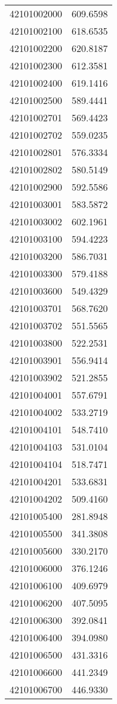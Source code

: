 \begin{longtable}[t]{lr}
42101002000 & 609.6598\\
42101002100 & 618.6535\\
42101002200 & 620.8187\\
42101002300 & 612.3581\\
42101002400 & 619.1416\\
42101002500 & 589.4441\\
42101002701 & 569.4423\\
42101002702 & 559.0235\\
42101002801 & 576.3334\\
42101002802 & 580.5149\\
42101002900 & 592.5586\\
42101003001 & 583.5872\\
42101003002 & 602.1961\\
42101003100 & 594.4223\\
42101003200 & 586.7031\\
42101003300 & 579.4188\\
42101003600 & 549.4329\\
42101003701 & 568.7620\\
42101003702 & 551.5565\\
42101003800 & 522.2531\\
42101003901 & 556.9414\\
42101003902 & 521.2855\\
42101004001 & 557.6791\\
42101004002 & 533.2719\\
42101004101 & 548.7410\\
42101004103 & 531.0104\\
42101004104 & 518.7471\\
42101004201 & 533.6831\\
42101004202 & 509.4160\\
42101005400 & 281.8948\\
42101005500 & 341.3808\\
42101005600 & 330.2170\\
42101006000 & 376.1246\\
42101006100 & 409.6979\\
42101006200 & 407.5095\\
42101006300 & 392.0841\\
42101006400 & 394.0980\\
42101006500 & 431.3316\\
42101006600 & 441.2349\\
42101006700 & 446.9330\\

\end{longtable}
